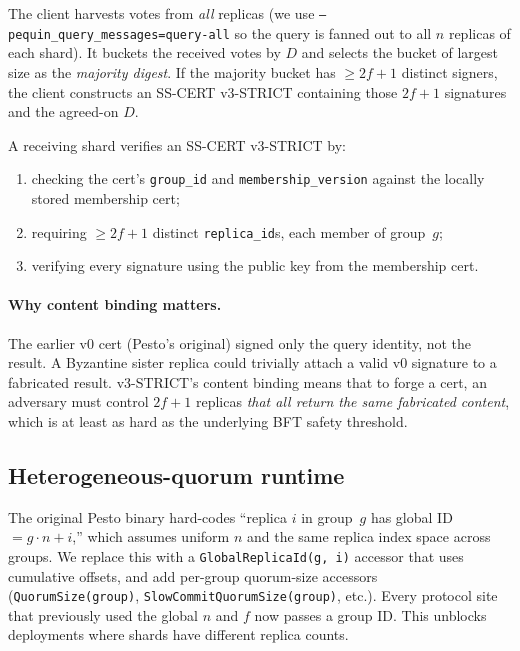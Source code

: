 \documentclass[letterpaper,twocolumn,10pt]{article}
\begin{document}
The client harvests votes from \emph{all} replicas (we use
\texttt{--pequin\_query\_messages=query-all} so the query is fanned out
to all $n$ replicas of each shard). It buckets the received votes by
$D$ and selects the bucket of largest size as the \emph{majority
digest}. If the majority bucket has $\geq 2f{+}1$ distinct signers,
the client constructs an SS-CERT v3-STRICT containing those $2f{+}1$
signatures and the agreed-on $D$.

A receiving shard verifies an SS-CERT v3-STRICT by:
\begin{enumerate}\setlength{\itemsep}{2pt}
\item checking the cert's \texttt{group\_id} and
      \texttt{membership\_version} against the locally stored
      membership cert;
\item requiring $\geq 2f{+}1$ distinct \texttt{replica\_id}s, each
      member of group~$g$;
\item verifying every signature using the public key from the
      membership cert.
\end{enumerate}

\paragraph{Why content binding matters.} The earlier v0 cert (Pesto's
original) signed only the query identity, not the result. A Byzantine
sister replica could trivially attach a valid v0 signature to a
fabricated result. v3-STRICT's content binding means that to forge a
cert, an adversary must control $2f{+}1$ replicas \emph{that all
return the same fabricated content}, which is at least as hard as the
underlying BFT safety threshold.

\subsection{Heterogeneous-quorum runtime}

The original Pesto binary hard-codes ``replica $i$ in group~$g$ has
global ID $= g \cdot n + i$,'' which assumes uniform $n$ and the same
replica index space across groups. We replace this with a
\texttt{GlobalReplicaId(g, i)} accessor that uses cumulative offsets,
and add per-group quorum-size accessors (\texttt{QuorumSize(group)},
\texttt{SlowCommitQuorumSize(group)}, etc.). Every protocol site that
previously used the global $n$ and $f$ now passes a group ID. This
unblocks deployments where shards have different replica counts.
\end{document}
